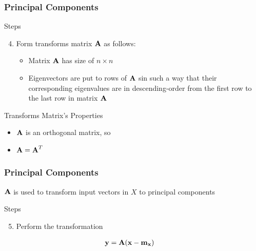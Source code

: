 \documentclass[english,11pt,table,handout]{beamer}
\begin{document}
\frame
{
	\frametitle{Principal Components}
	\large
	\begin{block}{Steps}
		\begin{enumerate}
			\setcounter{enumi}{3}
			\item Form transforms matrix $\text{\textbf{A}} $ as follows:
			\begin{itemize}
				\item Matrix $\text{\textbf{A}} $  has size of $n \times n$
				\item Eigenvectors are put to \alert{rows} of $\text{\textbf{A}} $ sin such a way that their corresponding eigenvalues are in descending-order from the first row to the last row in matrix $\text{\textbf{A}} $ 
			\end{itemize}
		\end{enumerate}
		
	\end{block}
	\begin{alertblock}{Transforms Matrix's Properties}
		\begin{itemize}
			\item $\text{\textbf{A}} $ is an orthogonal matrix, so
			\item $\text{\textbf{A}} = \text{\textbf{A}}^T$ 
		\end{itemize}
	\end{alertblock}
}

\frame
{
	\frametitle{Principal Components}
	\large
	$\text{\textbf{A}} $  is used to transform input vectors in $X$ to principal components

	\begin{block}{Steps}
		\begin{enumerate}
			\setcounter{enumi}{4}
			\item Perform the transformation
			
		\end{enumerate}
		
		\begin{equation}
		\nonumber
		\begin{split}
		\text{\textbf{y}} 
		&= \text{\textbf{A}} (\text{\textbf{x}} - \text{\textbf{m}}_\text{\textbf{x}})
		\end{split}
		\end{equation}
	\end{block}
}
\end{document}

